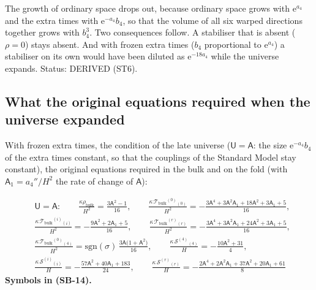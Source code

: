 \documentclass[
  10pt,
]{article}
\begin{document}
The growth of ordinary space drops out, because ordinary space grows
with \(\mathrm{e}^{a_4}\) and the extra times with
\(\mathrm{e}^{-a_4}b_4\), so that the volume of all six warped
directions together grows with \(b_4^3\). Two consequences follow. A
stabiliser that is absent (\(\rho = 0\)) stays absent. And with frozen
extra times (\(b_4\) proportional to \(\mathrm{e}^{a_4}\)) a stabiliser
on its own would have been diluted as \(\mathrm{e}^{-18a_4}\) while the
universe expands. Status: DERIVED (ST6).

\hypertarget{what-the-original-equations-required-when-the-universe-expanded}{%
\subsection{What the original equations required when the universe
expanded}\label{what-the-original-equations-required-when-the-universe-expanded}}

With frozen extra times, the condition of the late universe
(\(\mathsf{U} = \mathsf{A}\): the size \(\mathrm{e}^{-a_4}b_4\) of the
extra times constant, so that the couplings of the Standard Model stay
constant), the original equations required in the bulk and on the fold
(with \(\mathsf{A}_1 = a_4''/H^2\) the rate of change of
\(\mathsf{A}\)):

\[
\begin{aligned}
&\mathsf{U} = \mathsf{A}:\qquad \frac{\kappa\rho_{\mathrm{bulk}}}{H^2} = \frac{3\mathsf{A}^2 - 1}{16},\qquad
 \frac{\kappa\,\mathcal{T}_{\mathrm{bulk}}{}^{(0)}{}_{(0)}}{H^2} = -\frac{3\mathsf{A}^4 + 3\mathsf{A}^2\mathsf{A}_1 + 18\mathsf{A}^2 + 3\mathsf{A}_1 + 5}{16},\\
&\frac{\kappa\,\mathcal{T}_{\mathrm{bulk}}{}^{(i)}{}_{(i)}}{H^2} = -\frac{9\mathsf{A}^2 + 2\mathsf{A}_1 + 5}{16},\qquad
 \frac{\kappa\,\mathcal{T}_{\mathrm{bulk}}{}^{(r)}{}_{(r)}}{H^2} = -\frac{3\mathsf{A}^4 + 3\mathsf{A}^2\mathsf{A}_1 + 24\mathsf{A}^2 + 3\mathsf{A}_1 + 5}{16},\\
&\frac{\kappa\,\mathcal{T}_{\mathrm{bulk}}{}^{(0)}{}_{(4)}}{H^2} = \mathrm{sgn}(\sigma)\,\frac{3\mathsf{A}\big(1 + \mathsf{A}^2\big)}{16},\qquad
 \frac{\kappa\,\mathcal{S}^{(4)}{}_{(4)}}{H} = -\frac{10\mathsf{A}^2 + 31}{4},\\
&\frac{\kappa\,\mathcal{S}^{(i)}{}_{(i)}}{H} = -\frac{57\mathsf{A}^2 + 40\mathsf{A}_1 + 183}{24},\qquad
 \frac{\kappa\,\mathcal{S}^{(r)}{}_{(r)}}{H} = -\frac{2\mathsf{A}^4 + 2\mathsf{A}^2\mathsf{A}_1 + 37\mathsf{A}^2 + 20\mathsf{A}_1 + 61}{8}
\end{aligned} \tag{SB-14}
\] \textbf{Symbols in (SB-14).}
\end{document}
